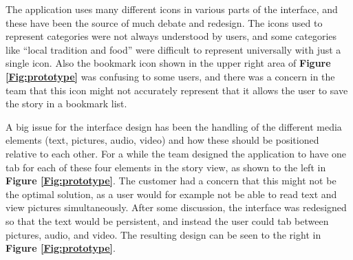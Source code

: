 The application uses many different icons in various parts of the interface, and these have been the source of much debate and redesign. The icons used to represent categories were not always understood by users, and some categories like “local tradition and food” were difficult to represent universally with just a single icon. Also the bookmark icon shown in the upper right area of \textbf{Figure \ref{Fig:prototype}} was confusing to some users, and there was a concern in the team that this icon might not accurately represent that it allows the user to save the story in a bookmark list.\newline

A big issue for the interface design has been the handling of the different media elements (text, pictures, audio, video) and how these should be positioned relative to each other. For a while the team designed the application to have one tab for each of these four elements in the story view, as shown to the left in \textbf{Figure \ref{Fig:prototype}}. The customer had a concern that this might not be the optimal solution, as a user would for example not be able to read text and view pictures simultaneously. After some discussion, the interface was redesigned so that the text would be persistent, and instead the user could tab between pictures, audio, and video. The resulting design can be seen to the right in \textbf{Figure \ref{Fig:prototype}}. \newline

